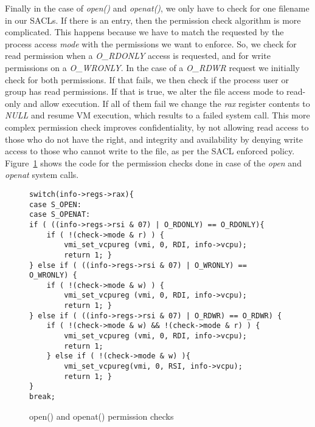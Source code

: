 \par Finally in the case of \textit{open()} and \textit{openat()}, we only have to check for one filename in our \ac{SACL}s. If there is an entry, then the permission check algorithm is more complicated. This happens because we have to match the requested by the process access \textit{mode} with the permissions we want to enforce. So, we check for read permission when a \textit{O\_RDONLY} access is requested, and for write permissions on a \textit{O\_WRONLY}. In the case of a \textit{O\_RDWR} request we initially check for both permissions. If that fails, we then check if the process user or group has read permissions. If that is true, we alter the file access mode to read-only and allow execution. If all of them fail we change the \textit{rax} register contents to \textit{NULL} and resume \ac{VM} execution, which results to a failed system call. This more complex permission check improves confidentiality, by not allowing read access to those who do not have the right, and integrity and availability by denying write access to those who cannot write to the file, as per the \ac{SACL} enforced policy. Figure~\ref{fig:open} shows the code for the permission checks done in case of the \textit{open} and \textit{openat} system calls.




\begin{figure}[ht!]
	\centering
	\begin{lstlisting}[basicstyle=\footnotesize]
switch(info->regs->rax){
case S_OPEN:
case S_OPENAT:
if ( ((info->regs->rsi & 07) | O_RDONLY) == O_RDONLY){
	if ( !(check->mode & r) ) {
		vmi_set_vcpureg (vmi, 0, RDI, info->vcpu);
		return 1; }
} else if ( ((info->regs->rsi & 07) | O_WRONLY) == O_WRONLY) {
	if ( !(check->mode & w) ) {
		vmi_set_vcpureg (vmi, 0, RDI, info->vcpu);
		return 1; }
} else if ( ((info->regs->rsi & 07) | O_RDWR) == O_RDWR) {
	if ( !(check->mode & w) && !(check->mode & r) ) {
		vmi_set_vcpureg (vmi, 0, RDI, info->vcpu);
		return 1;
	} else if ( !(check->mode & w) ){
		vmi_set_vcpureg(vmi, 0, RSI, info->vcpu);
		return 1; }
}
break;
	\end{lstlisting}
	\caption{open() and openat() permission checks}
	\label{fig:open}
\end{figure}



